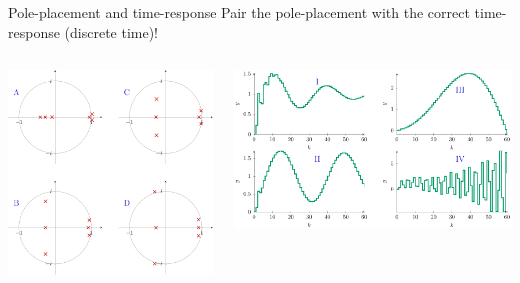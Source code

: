 \documentclass[presentation,aspectratio=169]{beamer}
\begin{document}
\begin{frame}[label={sec:orge1375d9}]{Pole-placement and time-response}
Pair the pole-placement with the correct time-response (discrete time)!
\begin{columns}
\begin{column}{0.4\columnwidth}
\begin{center}
\includegraphics[width=\linewidth]{../../figures/pzmap-discrete-apollo}
\end{center}
\end{column}
\begin{column}{0.6\columnwidth}
\begin{center}
\includegraphics[width=\linewidth]{../../figures/step-reponse-discrete-apollo}
\end{center}
\end{column}
\end{columns}
\end{frame}
\end{document}
